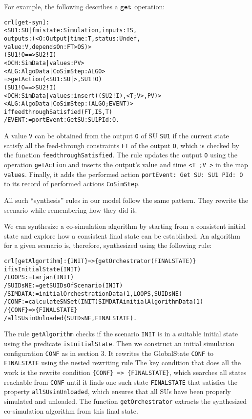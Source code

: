 For example, the following describes a $\mathtt{get}_{}$ operation:
\small
\begin{alltt}
crl [get-syn] :
< SU1 : SU | fmistate : Simulation, inputs : IS, 
             outputs : (< O : Output | time : T, status : Undef, 
                                       value : V, dependsOn : FT > OS) > 
(SU1 ! O ==> SU2 ! I)
< OCH : SimData | values : PV > 
< ALG : AlgoData | CoSimStep : ALGO >
=> getAction(< SU1 : SU | >, SU1 ! O)
   (SU1 ! O ==> SU2 ! I)
   < OCH : SimData | values : insert((SU2 ! I), < T ; V >, PV) >  
   < ALG : AlgoData | CoSimStep : (ALGO ; EVENT) >
if feedthroughSatisfied(FT, IS, T)
/ EVENT := portEvent: Get SU: SU1 PId: O . 
\end{alltt}
\normalsize
A value \texttt{V} can be obtained from the output \texttt{O} of SU \texttt{SU1} if the current state satisfy all the feed-through constraints \texttt{FT} of the output \texttt{O}, which is checked by the function \texttt{feedthroughSatisfied}.
The rule updates the output \texttt{O} using the operation \texttt{getAction} and inserts the output's value and time \texttt{<T ;V >} in the map \texttt{values}.
Finally, it adds the performed action \texttt{portEvent: Get SU: SU1 PId: O} to its record of performed actions \texttt{CoSimStep}.

All such ``synthesis'' rules in our model follow the same pattern.
They rewrite the scenario while remembering how they did it.

We can synthesize a co-simulation algorithm by starting from a consistent initial state and explore how a consistent final state can be established.
An algorithm for a given scenario is, therefore, synthesized using the following rule:

\small
\begin{alltt}
crl [getAlgortihm]: \{INIT\} => \{getOrchestrator(FINALSTATE)\}
if isInitialState(INIT)
  / LOOPS := tarjan(INIT)
  / SUIDsNE := getSUIDsOfScenario(INIT)
  / SIMDATA := initialOrchestrationData(1,LOOPS,SUIDsNE)
  / CONF := calculateSNSet(INIT) SIMDATA initialAlgorithmData(1)
  / \{CONF\} => \{FINALSTATE\} 
  / allSUsinUnloaded(SUIDsNE, FINALSTATE) .
\end{alltt}
\normalsize

The rule \texttt{getAlgorithm} checks if the scenario \texttt{INIT} is in a suitable initial state using the predicate \texttt{isInitialState}.
Then we construct an initial simulation configuration \texttt{CONF} as in section 3.
It rewrites the GlobalState \texttt{CONF} to \texttt{FINALSTATE} using the nested rewriting rule 
The key condition that does all the work is the rewrite condition \texttt{\{CONF\} => \{FINALSTATE\}}, which searches all states reachable from \texttt{CONF} until it finds one such state \texttt{FINALSTATE} that satisfies the property \texttt{allSUsinUnloaded}, which ensures that all SUs have been properly simulated and unloaded.
The function \texttt{getOrchestrator} extracts the synthesized co-simulation algorithm from this final state.

